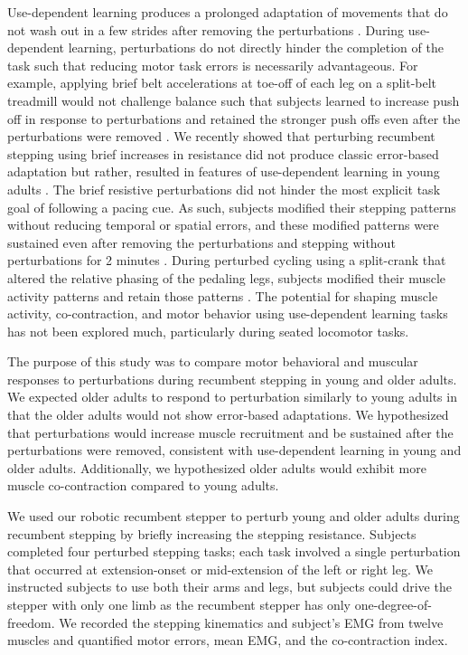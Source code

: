 \documentclass[../thesis_seyed.tex]{subfiles}
\begin{document}
Use-dependent learning produces a prolonged adaptation of movements that do not wash out in a few strides after removing the perturbations \cite{Diedrichsen2010-as}.  During use-dependent learning, perturbations do not directly hinder the completion of the task such that reducing motor task errors is necessarily advantageous. For example, applying brief belt accelerations at toe-off of each leg on a split-belt treadmill would not challenge balance such that subjects learned to increase push off in response to perturbations and retained the stronger push offs even after the perturbations were removed \cite{Farrens2020-fb}. We recently showed that perturbing recumbent stepping using brief increases in resistance did not produce classic error-based adaptation but rather, resulted in features of use-dependent learning in young adults \cite{Shirazi2021-ha}. The brief resistive perturbations did not hinder the most explicit task goal of following a pacing cue. As such, subjects modified their stepping patterns without reducing temporal or spatial errors, and these modified patterns were sustained even after removing the perturbations and stepping without perturbations for 2 minutes \cite{Shirazi2021-ha}. During perturbed   cycling using a split-crank that altered the relative phasing of the pedaling legs, subjects modified their muscle activity patterns and retain those patterns \cite{Alibiglou2011-to}. The potential for shaping muscle activity, co-contraction, and motor behavior using use-dependent learning tasks has not been explored much, particularly during seated locomotor tasks.

The purpose of this study was to compare motor behavioral and muscular responses to perturbations during recumbent stepping in young and older adults. We expected older adults to respond to perturbation similarly to young adults \cite{Shirazi2021-ha} in that the older adults would not show error-based adaptations. We hypothesized that perturbations would increase muscle recruitment and be sustained after the perturbations were removed, consistent with use-dependent learning in young and older adults. Additionally, we hypothesized older adults would exhibit more muscle co-contraction compared to young adults.

We used our robotic recumbent stepper to perturb young and older adults during recumbent stepping by briefly increasing the stepping resistance. Subjects completed four perturbed stepping tasks; each task involved a single perturbation that occurred at extension-onset or mid-extension of the left or right leg. We instructed subjects to use both their arms and legs, but subjects could drive the stepper with only one limb as the recumbent stepper has only one-degree-of-freedom. We recorded the stepping kinematics and subject's EMG from twelve muscles and quantified motor errors, mean EMG, and the co-contraction index.
\end{document}
